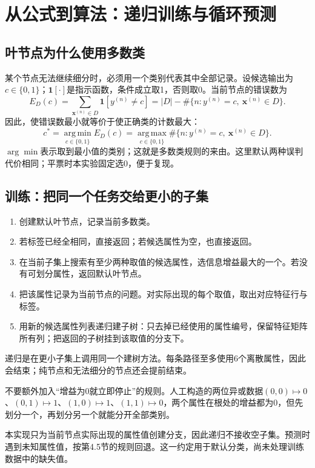 \documentclass[UTF8,a4paper,11pt,fontset=fandol]{ctexart}
\numberwithin{equation}{subsection}
\begin{document}
\clearpage
\section{从公式到算法：递归训练与循环预测}
\subsection{叶节点为什么使用多数类}
某个节点无法继续细分时，必须用一个类别代表其中全部记录。设候选输出为$c\in\{0,1\}$；$\mathbf1[\cdot]$是指示函数，条件成立取1，否则取0。当前节点的错误数为
\begin{equation}
E_D(c)=\sum_{\mathbf x^{(n)}\in D}\mathbf1[y^{(n)}\ne c]
=|D|-\#\{n:y^{(n)}=c,\ \mathbf x^{(n)}\in D\}.
\end{equation}
因此，使错误数最小就等价于使正确类的计数最大：
\begin{equation}
c^*=\operatorname*{arg\,min}_{c\in\{0,1\}}E_D(c)
=\operatorname*{arg\,max}_{c\in\{0,1\}}\#\{n:y^{(n)}=c,\ \mathbf x^{(n)}\in D\}.
\end{equation}
$\arg\min$表示取到最小值的类别；这就是多数类规则的来由。这里默认两种误判代价相同；平票时本实验固定选0，便于复现。

\subsection{训练：把同一个任务交给更小的子集}
\begin{enumerate}
\item 创建默认叶节点，记录当前多数类。
\item 若标签已经全相同，直接返回；若候选属性为空，也直接返回。
\item 在当前子集上搜索有至少两种取值的候选属性，选信息增益最大的一个。若没有可划分属性，返回默认叶节点。
\item 把该属性记录为当前节点的问题。对实际出现的每个取值，取出对应特征行与标签。
\item 用新的候选属性列表递归建子树：只去掉已经使用的属性编号，保留特征矩阵所有列；把返回的子树挂到该取值的分支下。
\end{enumerate}
递归是在更小子集上调用同一个建树方法。每条路径至多使用6个离散属性，因此会结束；纯节点和无法细分的节点还会提前结束。

\begin{pitfallbox}
不要额外加入“增益为0就立即停止”的规则。人工构造的两位异或数据$(0,0)\mapsto0$、$(0,1)\mapsto1$、$(1,0)\mapsto1$、$(1,1)\mapsto0$，两个属性在根处的增益都为0，但先划分一个，再划分另一个就能分开全部类别。
\end{pitfallbox}
\begin{notebox}
本实现只为当前节点实际出现的属性值创建分支，因此递归不接收空子集。预测时遇到未知属性值，按第4.5节的规则回退。这一约定用于默认分类，尚未处理训练数据中的缺失值。
\end{notebox}
\end{document}
